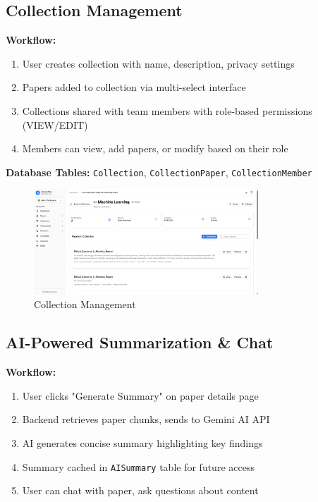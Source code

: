 \subsection{Collection Management}

\textbf{Workflow:}
\begin{enumerate}[leftmargin=*,topsep=3pt,itemsep=2pt]
    \item User creates collection with name, description, privacy settings
    \item Papers added to collection via multi-select interface
    \item Collections shared with team members with role-based permissions (VIEW/EDIT)
    \item Members can view, add papers, or modify based on their role
\end{enumerate}

\textbf{Database Tables:} \texttt{Collection}, \texttt{CollectionPaper}, \texttt{CollectionMember}

\begin{figure}[H]
\centering
\includegraphics[width=0.75\textwidth]{images/screenshots/collection_details.png}
\caption{Collection Management}
\label{fig:collection}
\end{figure}

\subsection{AI-Powered Summarization \& Chat}

\textbf{Workflow:}
\begin{enumerate}[leftmargin=*,topsep=3pt,itemsep=2pt]
    \item User clicks "Generate Summary" on paper details page
    \item Backend retrieves paper chunks, sends to Gemini AI API
    \item AI generates concise summary highlighting key findings
    \item Summary cached in \texttt{AISummary} table for future access
    \item User can chat with paper, ask questions about content
\end{enumerate}

